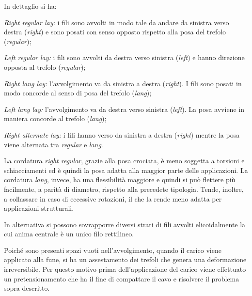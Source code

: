 In dettaglio si ha:
\begin{description}[font=\normalfont]
	\item[(a)] \emph{Right regular lay:} i fili sono avvolti in modo tale da andare da sinistra verso destra (\textit{right}) e sono posati con senso opposto rispetto alla posa del trefolo (\textit{regular});
	\item [(b)] \emph{Left regular lay:} i fili sono avvolti da destra verso sinistra (\textit{left}) e hanno direzione opposta al trefolo (\textit{regular});
	\item [(c)] \emph{Right lang lay:} l'avvolgimento va da sinistra a destra (\textit{right}). I fili sono posati in modo concorde al senso di posa del trefolo (\textit{lang});
	\item [(d)] \emph{Left lang lay:} l'avvolgimento va da destra verso sinistra (\textit{left}). La posa avviene in maniera concorde al trefolo (\textit{lang});
	\item[(e)] \emph{Right alternate lay:} i fili hanno verso da sinistra a destra (\textit{right}) mentre la posa viene alternata tra \textit{regular} e \textit{lang}.
\end{description}
La cordatura \textit{right regular}, grazie alla posa crociata, è meno soggetta a torsioni e schiacciamenti ed è quindi la posa adatta alla maggior parte delle applicazioni.
La cordatura \textit{lang}, invece, ha una flessibilità maggiore e quindi si può flettere più facilmente, a parità di diametro, rispetto alla precedete tipologia. Tende, inoltre, a collassare in caso di eccessive rotazioni, il che la rende meno adatta per applicazioni strutturali.

In alternativa si possono sovrapporre diversi strati di fili avvolti elicoidalmente la cui anima centrale è un unico filo rettilineo.

Poiché sono presenti spazi vuoti nell'avvolgimento, quando il carico viene applicato alla fune, si ha un assestamento dei trefoli che genera una deformazione irreversibile. Per questo motivo prima dell'applicazione del carico viene effettuato un pretensionamento che ha il fine di compattare il cavo e risolvere il problema sopra descritto.





